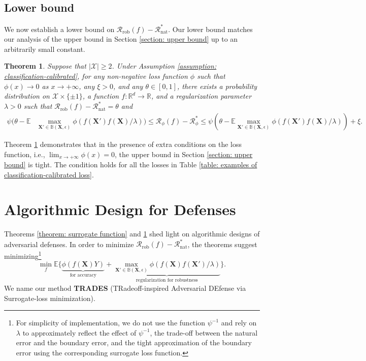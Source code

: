 \documentclass[11pt]{article}
\newcommand{\adv}{\mathrm{rob}}
\newcommand{\nat}{\mathrm{nat}}
\newtheorem{theorem}{Theorem}[section]
\newcommand{\R}{\mathbb{R}}
\newcommand{\X}{\bm{X}}
\newcommand{\0}{\mathbf{0}}
\newcommand{\1}{\mathbf{1}}
\newcommand{\cR}{\mathcal{R}}
\newcommand{\cX}{\mathcal{X}}
\newcommand{\bbB}{\mathbb{B}}
\newcommand{\bbE}{\mathbb{E}}
\begin{document}
\vspace{-0.1cm}
\subsection{Lower bound}
\label{section: lower bound}

We now establish a lower bound on $\cR_\adv(f)-\cR_\nat^*$. Our lower bound matches our analysis of the upper bound in Section \ref{section: upper bound} up to an arbitrarily small constant.

\begin{theorem}
\label{theorem: tightness of surrogate loss}
Suppose that $|\cX|\ge 2$. Under Assumption \ref{assumption: classification-calibrated}, for any non-negative loss function $\phi$ such that $\phi(x)\rightarrow 0$ as $x\rightarrow +\infty$, any $\xi>0$, and any $\theta\in[0,1]$, there exists a probability distribution on $\cX\times \{\pm 1\}$, a function $f:\R^d\rightarrow\R$, and a regularization parameter $\lambda>0$ such that
$\cR_\adv(f)-\cR_\nat^*=\theta$
and
\begin{equation*}
\begin{split}
\psi\Big(\theta-\bbE &\max_{\X'\in\bbB(\X,\epsilon)}\phi(f(\X')f(\X)/\lambda)\Big)\le \cR_\phi(f)-\cR_\phi^*\le \psi\left(\theta-\bbE \max_{\X'\in\bbB(\X,\epsilon)}\phi(f(\X')f(\X)/\lambda)\right)+\xi.
\end{split}
\end{equation*}
\end{theorem}

Theorem \ref{theorem: tightness of surrogate loss} demonstrates that in the presence of extra conditions on the loss function, i.e., $\lim_{x\rightarrow +\infty} \phi(x)=0$, the upper bound in Section \ref{section: upper bound} is tight. The condition holds for all the losses in Table \ref{table: examples of classification-calibrated loss}.


\section{Algorithmic Design for Defenses}
\label{section: algorithmic design for adversarial defenses}

Theorems \ref{theorem: surrogate function} and \ref{theorem: tightness of surrogate loss} shed light on algorithmic designs of adversarial defenses.
In order to minimize $\cR_\adv(f)-\cR_\nat^*$, the theorems suggest minimizing\footnote{For simplicity of implementation, we do not use the function $\psi^{-1}$ and rely on $\lambda$ to approximately reflect the effect of $\psi^{-1}$, the trade-off between the natural error and the boundary error, and the tight approximation of the boundary error using the corresponding surrogate loss function. }
\begin{equation}
\label{equ: new loss}
\min_{f} \bbE \Big\{\underbrace{\phi(f(\X)Y)}_{\text{for accuracy}}+\underbrace{\max_{\X'\in\bbB(\X,\epsilon)} \phi(f(\X)f(\X')/\lambda)}_{\text{regularization for robustness}}\Big\}.
\end{equation}
We name our method \textbf{TRADES} (TRadeoff-inspired Adversarial DEfense via Surrogate-loss minimization).
\end{document}
